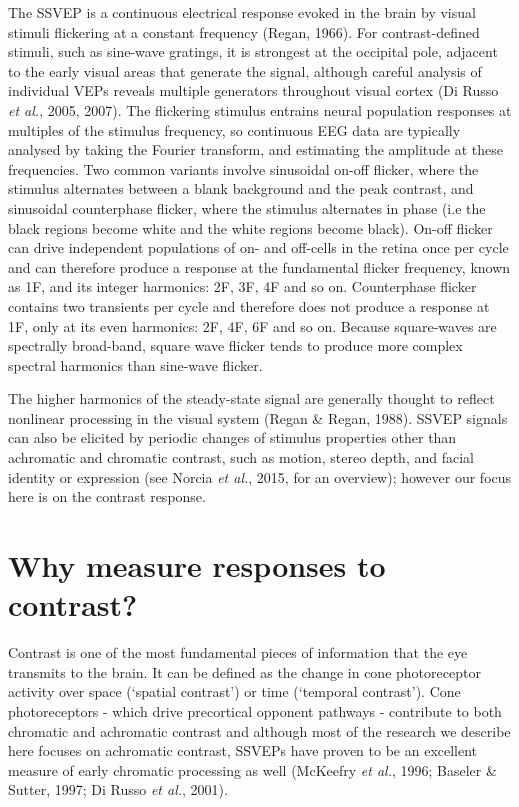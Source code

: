 \documentclass[
  letterpaper,
  DIV=11,
  numbers=noendperiod]{scrartcl}
\begin{document}
The SSVEP is a continuous electrical response evoked in the brain by
visual stimuli flickering at a constant frequency (Regan, 1966). For
contrast-defined stimuli, such as sine-wave gratings, it is strongest at
the occipital pole, adjacent to the early visual areas that generate the
signal, although careful analysis of individual VEPs reveals multiple
generators throughout visual cortex (Di Russo \emph{et al.}, 2005,
2007). The flickering stimulus entrains neural population responses at
multiples of the stimulus frequency, so continuous EEG data are
typically analysed by taking the Fourier transform, and estimating the
amplitude at these frequencies. Two common variants involve sinusoidal
on-off flicker, where the stimulus alternates between a blank background
and the peak contrast, and sinusoidal counterphase flicker, where the
stimulus alternates in phase (i.e the black regions become white and the
white regions become black). On-off flicker can drive independent
populations of on- and off-cells in the retina once per cycle and can
therefore produce a response at the fundamental flicker frequency, known
as 1F, and its integer harmonics: 2F, 3F, 4F and so on. Counterphase
flicker contains two transients per cycle and therefore does not produce
a response at 1F, only at its even harmonics: 2F, 4F, 6F and so on.
Because square-waves are spectrally broad-band, square wave flicker
tends to produce more complex spectral harmonics than sine-wave flicker.

The higher harmonics of the steady-state signal are generally thought to
reflect nonlinear processing in the visual system (Regan \& Regan,
1988). SSVEP signals can also be elicited by periodic changes of
stimulus properties other than achromatic and chromatic contrast, such
as motion, stereo depth, and facial identity or expression (see Norcia
\emph{et al.}, 2015, for an overview); however our focus here is on the
contrast response.

\section{Why measure responses to
contrast?}\label{why-measure-responses-to-contrast}

Contrast is one of the most fundamental pieces of information that the
eye transmits to the brain. It can be defined as the change in cone
photoreceptor activity over space (`spatial contrast') or time
(`temporal contrast'). Cone photoreceptors - which drive precortical
opponent pathways - contribute to both chromatic and achromatic contrast
and although most of the research we describe here focuses on achromatic
contrast, SSVEPs have proven to be an excellent measure of early
chromatic processing as well (McKeefry \emph{et al.}, 1996; Baseler \&
Sutter, 1997; Di Russo \emph{et al.}, 2001).
\end{document}
